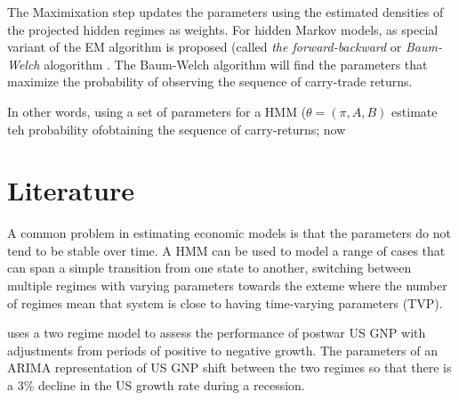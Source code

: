\documentclass[12pt, a4paper, oneside]{article} %
\begin{document}
The Maximixation step updates the parameters using the estimated densities of the projected hidden regimes as weights. For hidden Markov models, as special variant of the EM algorithm is proposed (called \emph{the forward-backward} or \emph{Baum-Welch} alogorithm \citet{Baum1970}.   The Baum-Welch algorithm will find the parameters that maximize the probability of observing the sequence of carry-trade returns.  

In other words, using a set of parameters for a HMM ($\theta = (\pi, A, B)$ estimate teh probability ofobtaining the sequence of carry-returns; now 


\section{Literature}
A common problem in estimating economic models is that the parameters do not tend to be stable over time.  A HMM can be used to model a range of cases that can span a simple transition from one state to another, switching between multiple regimes with varying parameters towards the exteme where the number of regimes mean that system is close to having time-varying parameters (TVP).  

\citet{Hamilton1989} uses a two regime model to assess the performance of postwar US GNP with adjustments from periods of positive to negative growth. The parameters of an ARIMA representation of US GNP shift between the two regimes so that there is a 3\% decline in the US growth rate during a recession.  




\end{document}
